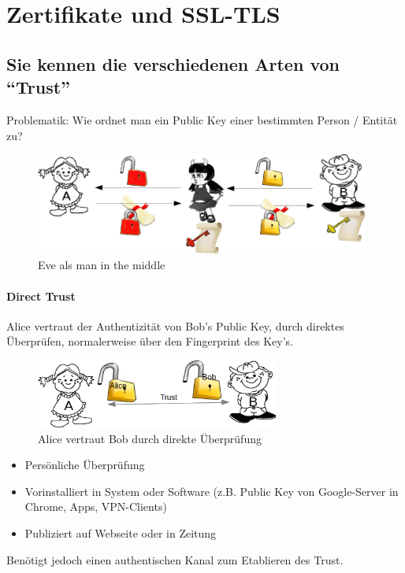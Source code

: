 \documentclass[10pt,a4paper]{article}
\begin{document}
\section{Zertifikate und SSL-TLS}
\subsection*{Sie kennen die verschiedenen Arten von "`Trust"'}
Problematik: Wie ordnet man ein Public Key einer bestimmten Person / Entität zu?
\begin{figure}[H]
    \begin{center}
    \includegraphics[width=11cm]{images/mitma.png}
    \caption{Eve als man in the middle}
    \label{mitma}
    \end{center}
\end{figure}

\paragraph*{Direct Trust}
Alice vertraut der Authentizität von Bob's Public Key, durch direktes Überprüfen, normalerweise über den Fingerprint des Key's.
\begin{figure}[H]
    \begin{center}
    \includegraphics[width=8cm]{images/directtrust.png}
    \caption{Alice vertraut Bob durch direkte Überprüfung}
    \label{directtrust}
    \end{center}
\end{figure}
\begin{itemize}[noitemsep,topsep=0pt,leftmargin=*]
    \item Persönliche Überprüfung
    \item Vorinstalliert in System oder Software (z.B. Public Key von Google-Server in Chrome, Apps, VPN-Clients)
    \item Publiziert auf Webseite oder in Zeitung
\end{itemize}
Benötigt jedoch einen authentischen Kanal zum Etablieren des Trust.
\end{document}
